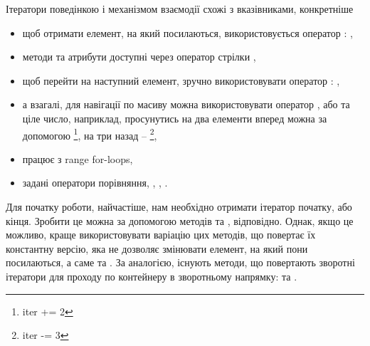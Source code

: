 \documentclass[12pt]{article}
\begin{document}
	Ітератори поведінкою і механізмом взаємодії схожі з вказівниками, конкретніше
	\begin{itemize}
		\item щоб отримати елемент, на який посилаються, використовується оператор \m{*}: ,
		\item методи та атрибути доступні через оператор стрілки \m{->},
		\item щоб перейти на наступний елемент, зручно використовувати оператор \m{++}: ,
		\item а взагалі, для навігації по масиву можна використовувати оператор \m{+}, або \m{-} та ціле число, наприклад, просунутись на два елементи вперед можна за допомогою \footnote{iter += 2}, на три назад -- \footnote{iter -= 3},
		\item працює з range for-loops,
		\item задані оператори порівняння, \m{==}, \m{!=}, \m{<}.
	\end{itemize}

	Для початку роботи, найчастіше, нам необхідно отримати ітератор початку, або кінця. Зробити це можна за допомогою методів  та , відповідно. Однак, якщо це можливо, краще використовувати варіацію цих методів, що повертає їх константну версію, яка не дозволяє змінювати елемент, на який пони посилаються, а саме  та . За аналогією, існують методи, що повертають зворотні ітератори для проходу по контейнеру в зворотньому напрямку:  та .
\end{document}
